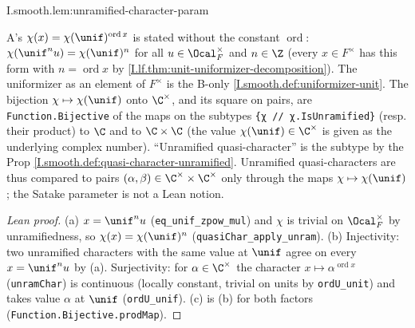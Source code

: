 \begin{lemma}
\end{lemma}
\begin{tfformal}{I.smooth.lem:unramified-character-param}
\begin{tffidelity}
A's $\chi(x)=\chi(\unif)^{\operatorname{ord}x}$ is stated without the constant $\operatorname{ord}$: $\chi(\unif^n u)=\chi(\unif)^n$ for all $u\in\Ocal_F^\times$ and $n\in\Z$ (every $x\in F^\times$ has this form with $n=\operatorname{ord}x$ by \cref{I.lf.thm:unit-uniformizer-decomposition}). The uniformizer as an element of $F^\times$ is the B-only \cref{I.smooth.def:uniformizer-unit}. The bijection $\chi\mapsto\chi(\unif)$ onto $\C^\times$, and its square on pairs, are \texttt{Function.Bijective} of the maps on the subtypes \texttt{\{χ // χ.IsUnramified\}} (resp. their product) to $\C$ and to $\C\times\C$ (the value $\chi(\unif)\in\C^\times$ is given as the underlying complex number). ``Unramified quasi-character'' is the subtype by the Prop \cref{I.smooth.def:quasi-character-unramified}. Unramified quasi-characters are thus compared to pairs $(\alpha,\beta)\in\C^\times\times\C^\times$ only through the maps $\chi\mapsto\chi(\unif)$; the Satake parameter is not a Lean notion.
\end{tffidelity}
\end{tfformal}
\begin{proof}[Lean proof]
(a) $x=\unif^n u$ (\texttt{eq\_unif\_zpow\_mul}) and $\chi$ is trivial on $\Ocal_F^\times$ by unramifiedness, so $\chi(x)=\chi(\unif)^n$ (\texttt{quasiChar\_apply\_unram}). (b) Injectivity: two unramified characters with the same value at $\unif$ agree on every $x=\unif^nu$ by (a). Surjectivity: for $\alpha\in\C^\times$ the character $x\mapsto\alpha^{\operatorname{ord}x}$ (\texttt{unramChar}) is continuous (locally constant, trivial on units by \texttt{ordU\_unit}) and takes value $\alpha$ at $\unif$ (\texttt{ordU\_unif}). (c) is (b) for both factors (\texttt{Function.Bijective.prodMap}).
\end{proof}


